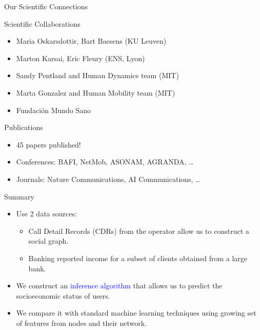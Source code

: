 \documentclass[usenames,dvipsnames]{beamer}
\begin{document}
\begin{frame}{Our Scientific Connections}
\begin{block}{Scientific Collaborations}
\begin{itemize}
\item Maria Oskarsdottir, Bart Baesens (KU Leuven)
\item Marton Karsai, Eric Fleury (ENS, Lyon)
\item Sandy Pentland and Human Dynamics team (MIT)
\item Marta Gonzalez and Human Mobility team (MIT)
\item Fundación Mundo Sano
\end{itemize}
\end{block}

\pause

\begin{block}{Publications}
\begin{itemize}
\item 45 papers published!
\item Conferences: BAFI, NetMob, ASONAM, AGRANDA, \ldots
\item Journals: Nature Communications, AI Communications, \ldots
\end{itemize}
\end{block}

{\tiny 
\nocite{leo2015socioeconomic}
\nocite{sarraute2015city}
\nocite{sarraute2014}
}
\end{frame}


\begin{frame}{Summary}

\begin{itemize}

\begin{block}{Objective}
Compare methods for the \textbf{inference of socioeconomic status} in the communication graph.
\end{block}
\medskip

\pause

\item Use 2 data sources:
\begin{itemize}
\item Call Detail Records (CDRs) from the operator allow us to construct a social graph.
\item Banking reported income for a subset of clients obtained from a large bank.
\end{itemize} 

\item We construct an \textcolor{blue}{inference algorithm} that allows us to predict the socioeconomic status of users.

\item We compare it with standard machine learning techniques using growing set of features from nodes and their network.

\end{itemize}

\end{frame}
\end{document}
